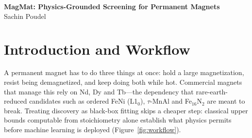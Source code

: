 \documentclass[10pt,a4paper]{article}
\begin{document}

\begin{center}
  {\Large\sffamily\bfseries\color{navyblue} MagMat: Physics-Grounded Screening for Permanent Magnets}\\[0.2em]
  {\large\sffamily Sachin Poudel}
\end{center}
\vspace{-0.6em}

\begin{abstract}
\noindent\small
Clean energy technologies such as electric vehicles and wind turbines depend heavily on high-performance permanent magnets, most of which require critical rare-earth elements with vulnerable supply chains. Accelerating the discovery of sustainable alternatives requires knowing what physics permits before training machine learning models. Here, we evaluate 56{,}781 experimental records against four classical condensed-matter boundaries: Slater-Pauling atomic band limits, Stoner quantum exchange, Kronmüller micromagnetics, and the Maxwell thermodynamic energy product ceiling. The results reveal a clear physical division: while saturation magnetization routinely nears its atomic band ceiling, measured coercivity achieves only $\approx$11\% of its theoretical single-crystal limit ($\alpha \approx 0.11$). This 89\% deficit originates in microstructural defects and grain boundary misalignment that chemical stoichiometry alone cannot describe. To bridge this reality gap, we combine 3D structural representations (DAO crystal diffusion and MACE equivariant transformers) with trained multi-task machine learning ensembles for magnetic phase classification and transition temperatures ($T_C, T_N$). An open-source interactive application enables real-time screening, physics boundary calculation, and inverse discovery for sustainable permanent magnets.
\end{abstract}
\vspace{-0.5em}

\section{Introduction and Workflow}
A permanent magnet has to do three things at once: hold a large magnetization, resist being demagnetized, and keep doing both while hot. Commercial magnets that manage this rely on Nd, Dy and Tb---the dependency that rare-earth-reduced candidates such as ordered FeNi (L1$_0$), $\tau$-MnAl and Fe$_{16}$N$_2$ are meant to break. Treating discovery as black-box fitting skips a cheaper step: classical upper bounds computable from stoichiometry alone establish what physics permits before machine learning is deployed (Figure~\ref{fig:workflow}).
\end{document}
